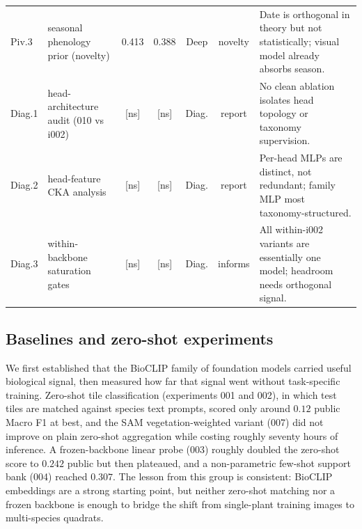 \begin{table}[t]
\begin{tabularx}{\linewidth}{@{}l l c c c c X@{}}
Piv.3 & seasonal phenology prior (novelty) & 0.413 & 0.388 & Deep & novelty & Date is orthogonal in theory but not statistically; visual model already absorbs season. \\
Diag.1 & head-architecture audit (010 vs i002) & [ns] & [ns] & Diag. & report & No clean ablation isolates head topology or taxonomy supervision. \\
Diag.2 & head-feature CKA analysis & [ns] & [ns] & Diag. & report & Per-head MLPs are distinct, not redundant; family MLP most taxonomy-structured. \\
Diag.3 & within-backbone saturation gates & [ns] & [ns] & Diag. & informs & All within-i002 variants are essentially one model; headroom needs orthogonal signal. \\
\bottomrule
\end{tabularx}
\end{table}

\subsection{Baselines and zero-shot experiments}
We first established that the BioCLIP family of foundation models carried useful
biological signal, then measured how far that signal went without task-specific
training. Zero-shot tile classification (experiments 001 and 002), in which test
tiles are matched against species text prompts, scored only around $0.12$ public
Macro F1 at best, and the SAM vegetation-weighted variant (007) did not improve on
plain zero-shot aggregation while costing roughly seventy hours of inference. A
frozen-backbone linear probe (003) roughly doubled the zero-shot score to $0.242$
public but then plateaued, and a non-parametric few-shot support bank (004) reached
$0.307$. The lesson from this group is consistent: BioCLIP embeddings are a strong
starting point, but neither zero-shot matching nor a frozen backbone is enough to
bridge the shift from single-plant training images to multi-species quadrats.

